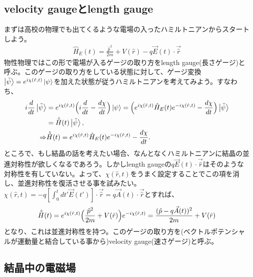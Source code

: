 \documentclass[a4paper,12pt]{jsarticle}
\begin{document}
\subsection{velocity gaugeとlength gauge}
まずは高校の物理でも出てくるような電場の入ったハミルトニアンからスタートしよう。
\begin{align}
  \hat{H}_{E}(t) = \frac{\hat{p}^2}{2m} + V(\hat{r}) - q \vec{E}(t)\cdot\vec{\hat{r}}
\end{align}
物性物理ではこの形で電場が入るゲージの取り方をlength gauge(長さゲージ)と呼ぶ。このゲージの取り方をしている状態に対して、ゲージ変換$\ket{\tilde{\psi}} = e^{i\chi(\hat{r}, t)}\ket{\psi}$を加えた状態が従うハミルトニアンを考えてみよう。すなわち、
\begin{align}
  i\frac{d}{dt}\ket{\tilde{\psi}} &= e^{i\chi(\hat{r}, t)}\Bigl(i\frac{d}{dt} - \frac{d\chi}{dt}\Bigr)\ket{\psi} = \Bigl(e^{i\chi(\hat{r}, t)}\hat{H}_E(t)e^{-i\chi(\hat{r}, t)} - \frac{d\chi}{dt}\Bigr)\ket{\tilde{\psi}}\\
  &= \hat{\tilde{H}}(t) \ket{\tilde{\psi}},\\
  \Rightarrow & \hat{\tilde{H}}(t) = e^{i\chi(\hat{r}, t)}\hat{H}_E(t)e^{-i\chi(\hat{r}, t)} - \frac{d\chi}{dt}.
\end{align}
ところで、もし結晶の話を考えたい場合、なんとなくハミルトニアンに結晶の並進対称性が欲しくなるであろう。しかしlength gaugeの$q \vec{E}(t)\cdot\vec{\hat{r}}$はそのような対称性を有していない。よって、$\chi(\hat{r}, t)$をうまく設定することでこの項を消し、並進対称性を復活させる事を試みたい。$\chi(\hat{r}, t) = -q[\int_0^t dt' \vec{E}(t')]\cdot \vec{\hat{r}} = q \vec{A}(t)\cdot \vec{\hat{r}}$とすれば、
\begin{align}
    \hat{\tilde{H}}(t) = e^{i\chi(\hat{r}, t)}\Bigl(\frac{\hat{p}^2}{2m} + V(\hat{r})\Bigr)e^{-i\chi(\hat{r}, t)} = \frac{(\hat{p} - q \vec{A}(t))^2}{2m} + V(\hat{r})\label{velocity_gauge0}
\end{align}
となり、これは並進対称性を持つ。このゲージの取り方を(ベクトルポテンシャルが運動量と結合している事から)velocity gauge(速さゲージ)と呼ぶ。

\subsection{結晶中の電磁場}
\end{document}
